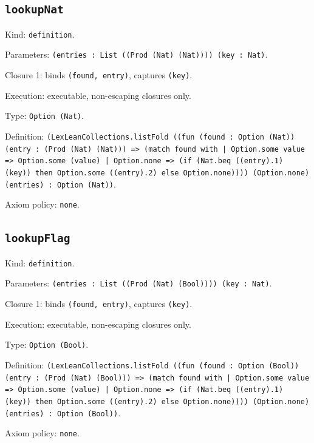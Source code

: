 \documentclass[11pt]{article}
\begin{document}
\subsection*{\texttt{lookupNat}}
\noindent Kind: \texttt{definition}.\par
\noindent Parameters: \texttt{(entries : List ((Prod (Nat) (Nat)))) (key : Nat)}.\par
\noindent Closure 1: binds \texttt{(found, entry)}, captures \texttt{(key)}.\par
\noindent Execution: executable, non-escaping closures only.\par
\noindent Type: \texttt{Option (Nat)}.\par
\noindent Definition: \texttt{(LexLeanCollections.listFold ((fun (found : Option (Nat)) (entry : (Prod (Nat) (Nat))) => (match found with | Option.some value => Option.some (value) | Option.none => (if (Nat.beq ((entry).1) (key)) then Option.some ((entry).2) else Option.none)))) (Option.none) (entries) : Option (Nat))}.\par
\noindent Axiom policy: \texttt{none}.\par
\subsection*{\texttt{lookupFlag}}
\noindent Kind: \texttt{definition}.\par
\noindent Parameters: \texttt{(entries : List ((Prod (Nat) (Bool)))) (key : Nat)}.\par
\noindent Closure 1: binds \texttt{(found, entry)}, captures \texttt{(key)}.\par
\noindent Execution: executable, non-escaping closures only.\par
\noindent Type: \texttt{Option (Bool)}.\par
\noindent Definition: \texttt{(LexLeanCollections.listFold ((fun (found : Option (Bool)) (entry : (Prod (Nat) (Bool))) => (match found with | Option.some value => Option.some (value) | Option.none => (if (Nat.beq ((entry).1) (key)) then Option.some ((entry).2) else Option.none)))) (Option.none) (entries) : Option (Bool))}.\par
\noindent Axiom policy: \texttt{none}.\par
\end{document}
